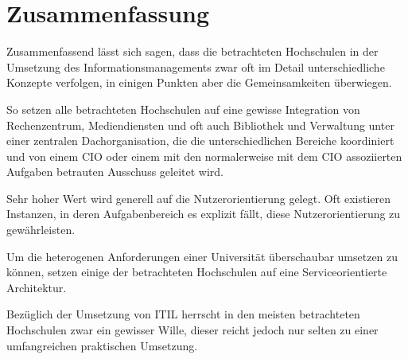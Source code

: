 \newpage
\section{Zusammenfassung}
Zusammenfassend lässt sich sagen, dass die betrachteten Hochschulen in der Umsetzung des Informationsmanagements zwar oft im Detail unterschiedliche Konzepte verfolgen, in einigen Punkten aber die Gemeinsamkeiten überwiegen.

So setzen alle betrachteten Hochschulen auf eine gewisse Integration von Rechenzentrum, Mediendiensten und oft auch Bibliothek und Verwaltung unter einer zentralen Dachorganisation, die die unterschiedlichen Bereiche koordiniert und von einem CIO oder einem mit den normalerweise mit dem CIO assoziierten Aufgaben betrauten Ausschuss geleitet wird.

Sehr hoher Wert wird generell auf die Nutzerorientierung gelegt. Oft existieren Instanzen, in deren Aufgabenbereich es explizit fällt, diese Nutzerorientierung zu gewährleisten.

Um die heterogenen Anforderungen einer Universität überschaubar umsetzen zu können, setzen einige der betrachteten Hochschulen auf eine Serviceorientierte Architektur.

Bezüglich der Umsetzung von ITIL herrscht in den meisten betrachteten Hochschulen zwar ein gewisser Wille, dieser reicht jedoch nur selten zu einer umfangreichen praktischen Umsetzung.